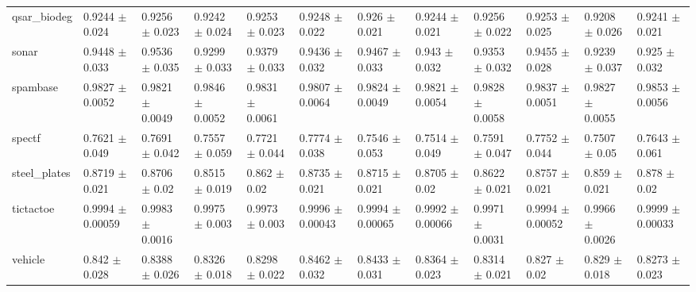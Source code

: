 \begin{tabular}{llllllllllll}
qsar\_biodeg & 0.9244 $\pm$ 0.024 & 0.9256 $\pm$ 0.023 & 0.9242 $\pm$ 0.024 & 0.9253 $\pm$ 0.023 & 0.9248 $\pm$ 0.022 & 0.926 $\pm$ 0.021 & 0.9244 $\pm$ 0.021 & 0.9256 $\pm$ 0.022 & 0.9253 $\pm$ 0.025 & 0.9208 $\pm$ 0.026 & 0.9241 $\pm$ 0.021 \\
sonar & 0.9448 $\pm$ 0.033 & 0.9536 $\pm$ 0.035 & 0.9299 $\pm$ 0.033 & 0.9379 $\pm$ 0.033 & 0.9436 $\pm$ 0.032 & 0.9467 $\pm$ 0.033 & 0.943 $\pm$ 0.032 & 0.9353 $\pm$ 0.032 & 0.9455 $\pm$ 0.028 & 0.9239 $\pm$ 0.037 & 0.925 $\pm$ 0.032 \\
spambase & 0.9827 $\pm$ 0.0052 & 0.9821 $\pm$ 0.0049 & 0.9846 $\pm$ 0.0052 & 0.9831 $\pm$ 0.0061 & 0.9807 $\pm$ 0.0064 & 0.9824 $\pm$ 0.0049 & 0.9821 $\pm$ 0.0054 & 0.9828 $\pm$ 0.0058 & 0.9837 $\pm$ 0.0051 & 0.9827 $\pm$ 0.0055 & 0.9853 $\pm$ 0.0056 \\
spectf & 0.7621 $\pm$ 0.049 & 0.7691 $\pm$ 0.042 & 0.7557 $\pm$ 0.059 & 0.7721 $\pm$ 0.044 & 0.7774 $\pm$ 0.038 & 0.7546 $\pm$ 0.053 & 0.7514 $\pm$ 0.049 & 0.7591 $\pm$ 0.047 & 0.7752 $\pm$ 0.044 & 0.7507 $\pm$ 0.05 & 0.7643 $\pm$ 0.061 \\
steel\_plates & 0.8719 $\pm$ 0.021 & 0.8706 $\pm$ 0.02 & 0.8515 $\pm$ 0.019 & 0.862 $\pm$ 0.02 & 0.8735 $\pm$ 0.021 & 0.8715 $\pm$ 0.021 & 0.8705 $\pm$ 0.02 & 0.8622 $\pm$ 0.021 & 0.8757 $\pm$ 0.021 & 0.859 $\pm$ 0.021 & 0.878 $\pm$ 0.02 \\
tictactoe & 0.9994 $\pm$ 0.00059 & 0.9983 $\pm$ 0.0016 & 0.9975 $\pm$ 0.003 & 0.9973 $\pm$ 0.003 & 0.9996 $\pm$ 0.00043 & 0.9994 $\pm$ 0.00065 & 0.9992 $\pm$ 0.00066 & 0.9971 $\pm$ 0.0031 & 0.9994 $\pm$ 0.00052 & 0.9966 $\pm$ 0.0026 & 0.9999 $\pm$ 0.00033 \\
vehicle & 0.842 $\pm$ 0.028 & 0.8388 $\pm$ 0.026 & 0.8326 $\pm$ 0.018 & 0.8298 $\pm$ 0.022 & 0.8462 $\pm$ 0.032 & 0.8433 $\pm$ 0.031 & 0.8364 $\pm$ 0.023 & 0.8314 $\pm$ 0.021 & 0.827 $\pm$ 0.02 & 0.829 $\pm$ 0.018 & 0.8273 $\pm$ 0.023 \\
\bottomrule
\end{tabular}
